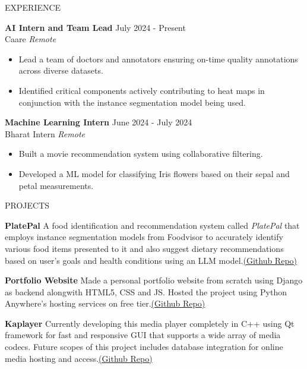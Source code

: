 \documentclass{resume} %
\begin{document}
\begin{rSection}{EXPERIENCE}

\textbf{AI Intern and Team Lead } \hfill  July 2024 - Present\\
Caare \hfill \textit{Remote}
 \begin{itemize}
    \itemsep -3pt {} 
     \item Lead a team of doctors and annotators ensuring on-time quality annotations across diverse datasets.
     \item Identified critical components actively contributing to heat maps in conjunction with the instance segmentation model being used. 
 \end{itemize}


\textbf{Machine Learning Intern} \hfill  June 2024 - July 2024\\
Bharat Intern \hfill \textit{Remote}
 \begin{itemize}
    \itemsep -3pt {} 
     \item Built a movie recommendation system using collaborative filtering.
     \item Developed a ML model for classifying Iris flowers based on their sepal and petal measurements.
 \end{itemize}
 


\end{rSection} 


\begin{rSection}{PROJECTS}
\vspace{-1.25em}
\item \textbf{PlatePal} {A food identification and recommendation system called \textit{PlatePal} that employs instance segmentation models from Foodvisor to accurately identify various food items presented to it and also suggest dietary recommendations based on user's goals and health conditions using an LLM model.}\href{https://github.com/vegam05/PlatePal}{(Github Repo)}
\item \textbf{Portfolio Website} {Made a personal portfolio website from scratch using Django as backend alongwith HTML5, CSS and JS. Hosted the project using Python Anywhere's hosting services on free tier.}\href{https://github.com/vegam05/portfolio}{(Github Repo)}
\item \textbf{Kaplayer} {Currently developing this media player completely in C++ using Qt framework for fast and responsive GUI that supports a wide array of media codecs. Future scopes of this project includes database integration for online media hosting and access.\href{https://github.com/vegam05/kaplayer}{(Github Repo)}}
\end{rSection} 

\end{document}
